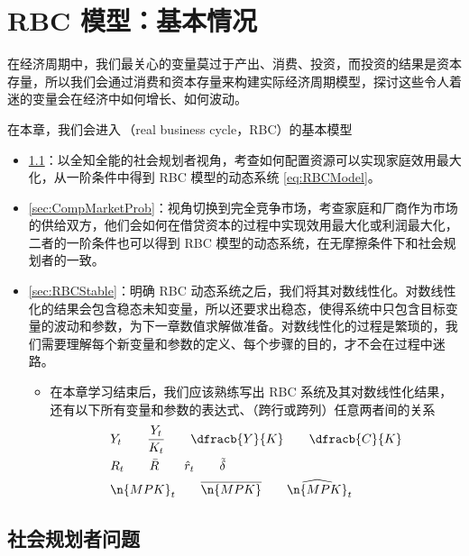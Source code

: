 

\ChapterGeometry

\chapter{RBC 模型：基本情况}\label{ch:03}

在经济周期中，我们最关心的变量莫过于产出、消费、投资，而投资的结果是资本存量，所以我们会通过消费和资本存量来构建实际经济周期模型，探讨这些令人着迷的变量会在经济中如何增长、如何波动。

在本章，我们会进入\,（real business cycle，RBC）的基本模型
\begin{itemize}
    \item \ref{sec:SocialPlanProb}：以全知全能的社会规划者视角，考查如何配置资源可以实现家庭效用最大化，从一阶条件中得到 RBC 模型的动态系统 \ref{eq:RBCModel}。
    \item \ref{sec:CompMarketProb}：视角切换到完全竞争市场，考查家庭和厂商作为市场的供给双方，他们会如何在借贷资本的过程中实现效用最大化或利润最大化，二者的一阶条件也可以得到 RBC 模型的动态系统，在无摩擦条件下和社会规划者的一致。
    \item \ref{sec:RBCStable}：明确 RBC 动态系统之后，我们将其对数线性化。对数线性化的结果会包含稳态未知变量，所以还要求出稳态，使得系统中只包含目标变量的波动和参数，为下一章数值求解做准备。对数线性化的过程是繁琐的，我们需要理解每个新变量和参数的定义、每个步骤的目的，才不会在过程中迷路。
    \begin{itemize}
        \item 在本章学习结束后，我们应该熟练写出 RBC 系统及其对数线性化结果，还有以下所有变量和参数的表达式、（跨行或跨列）任意两者间的关系
        \begin{align*}
            &Y_t \qquad \dfrac{Y_t}{K_t}\qquad\dfracb{Y}{K} \qquad \dfracb{C}{K}\\
            &R_t \qquad \bar R \qquad \hat r_t\qquad\tilde\delta\\
            &\n{MPK}_t \qquad \overline{\n{MPK}} \qquad \widehat{\n{MPK}}_t
        \end{align*}
    \end{itemize}
\end{itemize}

\section{社会规划者问题}\label{sec:SocialPlanProb}

